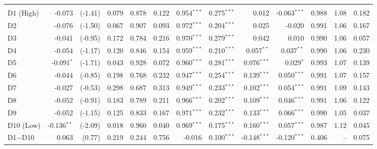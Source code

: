 {\begin{longtable}[t]{lrrrrrrrrrrrr}
\endfoot
\bottomrule
\endlastfoot
\addlinespace[0.3em]
\multicolumn{13}{l}{\textit{Panel A: Full sample, t-statistic ranking}}\\
\hspace{1em}D1 (High) & -0.073 & (-1.41) & 0.079 & 0.878 & 0.122 & 0.954$^{***}$ & 0.275$^{***}$ & 0.012 & -0.063$^{***}$ & 0.988 & 1.08 & 0.182\\
\hspace{1em}D2 & -0.076 & (-1.50) & 0.067 & 0.907 & 0.093 & 0.972$^{***}$ & 0.204$^{***}$ & 0.025 & -0.020 & 0.991 & 1.06 & 0.167\\
\hspace{1em}D3 & -0.041 & (-0.95) & 0.172 & 0.784 & 0.216 & 0.970$^{***}$ & 0.279$^{***}$ & 0.042 & 0.010 & 0.990 & 1.06 & 0.057\\
\hspace{1em}D4 & -0.054 & (-1.17) & 0.120 & 0.846 & 0.154 & 0.959$^{***}$ & 0.210$^{***}$ & 0.057$^{**}$ & 0.037$^{**}$ & 0.990 & 1.06 & 0.230\\
\hspace{1em}D5 & -0.091$^{*}$ & (-1.71) & 0.043 & 0.928 & 0.072 & 0.960$^{***}$ & 0.281$^{***}$ & 0.076$^{***}$ & 0.029$^{*}$ & 0.993 & 1.07 & 0.139\\
\hspace{1em}D6 & -0.044 & (-0.85) & 0.198 & 0.768 & 0.232 & 0.947$^{***}$ & 0.254$^{***}$ & 0.139$^{***}$ & 0.050$^{***}$ & 0.991 & 1.07 & 0.157\\
\hspace{1em}D7 & -0.027 & (-0.53) & 0.298 & 0.687 & 0.313 & 0.949$^{***}$ & 0.233$^{***}$ & 0.102$^{***}$ & 0.054$^{***}$ & 0.991 & 1.09 & 0.143\\
\hspace{1em}D8 & -0.052 & (-0.91) & 0.183 & 0.789 & 0.211 & 0.966$^{***}$ & 0.202$^{***}$ & 0.109$^{***}$ & 0.046$^{***}$ & 0.991 & 1.06 & 0.122\\
\hspace{1em}D9 & -0.052 & (-1.15) & 0.125 & 0.833 & 0.167 & 0.971$^{***}$ & 0.232$^{***}$ & 0.133$^{***}$ & 0.066$^{***}$ & 0.990 & 1.05 & 0.037\\
\hspace{1em}D10 (Low) & -0.136$^{**}$ & (-2.09) & 0.018 & 0.960 & 0.040 & 0.969$^{***}$ & 0.175$^{***}$ & 0.160$^{***}$ & 0.057$^{***}$ & 0.987 & 1.12 & 0.045\\
\hspace{1em}D1$-$D10 & 0.063 & (0.77) & 0.219 & 0.244 & 0.756 & -0.016 & 0.100$^{***}$ & -0.148$^{***}$ & -0.120$^{***}$ & 0.406 & -- & 0.075\\

\end{longtable}}
